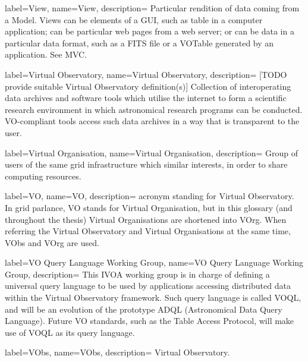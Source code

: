 {
    label={View},
    name={View},
    description={
    	Particular rendition of data coming from a \gls{Model}. Views
        can be elements of a \gls{GUI}, such as table in a computer
        application; can be particular web pages from a web server; or
        can be data in a particular data format, such as a \gls{FITS}
        file or a VOTable generated by an application. See \gls{MVC}.
    }
}

{
    label={Virtual Observatory},
    name={Virtual Observatory},
    description={
    	[TODO provide suitable Virtual Observatory definition(s)]
        Collection of interoperating data archives and software tools
        which utilise the internet to form a scientific research
        environment in which astronomical research programs can be
        conducted. VO-compliant tools access such data archives in a
        way that is transparent to the user.
    }
}

{
    label={Virtual Organisation},
    name={Virtual Organisation},
    description={
    	Group of users of the same \gls{grid} infrastructure which
        similar interests, in order to share computing resources.
    }
}

{
    label={VO},
    name={VO},
    description={
    	acronym standing for \gls{Virtual Observatory}. In \gls{grid}
        parlance, VO stands for \gls{Virtual Organisation}, but in this
        glossary (and throughout the thesis) Virtual Organisations are
        shortened into \gls{VOrg}. When referring the Virtual
        Observatory and Virtual Organisations at the same time,
        \gls{VObs} and \gls{VOrg} are used.
    }
}

{
    label={VO Query Language Working Group},
    name={VO Query Language Working Group},
    description={
    	This \gls{IVOA} working group is in charge of defining a
        universal query language to be used by applications accessing
        distributed data within the \gls{Virtual Observatory}
        framework. Such query language is called VOQL, and will be an
        evolution of the prototype ADQL (Astronomical Data Query
        Language). Future VO standards, such as the Table Access
        Protocol, will make use of VOQL as its query language.
    }
}


{
    label={VObs},
    name={VObs},
    description={
    	\gls{Virtual Observatory}.
    }
}

